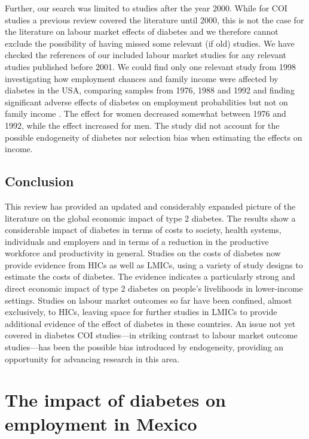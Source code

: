 Further, our search was limited to studies after the year 2000. While for \ac{COI} studies a previous review covered the literature until 2000, this is not the case for the literature on labour market effects of diabetes and we therefore cannot exclude the possibility of having missed some relevant (if old) studies. We have checked the references of our included labour market
studies for any relevant studies published before 2001. We could find only one relevant study from 1998 investigating how employment
chances and family income were affected by diabetes in the USA, comparing samples from 1976, 1988 and 1992 and finding significant
adverse effects of diabetes on employment probabilities but not on family income \parencite{Kahn1998b}. The effect for women decreased somewhat between 1976 and 1992, while the effect increased for men. The study did not account for the possible endogeneity of diabetes nor selection bias when estimating the effects on income.

\section{Conclusion}

This review has provided an updated and considerably expanded picture of the literature on the global economic impact of type 2 diabetes. The results show a considerable impact of diabetes in terms of costs to society, health systems, individuals and employers and in terms of a reduction in the productive workforce and productivity in general. Studies on the costs of diabetes now provide evidence from \acp{HIC} as well as \acp{LMIC}, using a variety of study designs to estimate the costs of diabetes. The evidence indicates a particularly strong and direct economic impact of type 2 diabetes on people's livelihoods in lower-income settings. Studies on labour market outcomes so far have been confined, almost exclusively, to \acp{HIC}, leaving space for further studies in \acp{LMIC} to provide additional evidence of the effect of diabetes in these countries. An issue not yet covered in diabetes \ac{COI} studies---in striking contrast to labour market outcome studies---has been the possible bias introduced by endogeneity, providing an opportunity for advancing research in this area. 
\clearpage

 \newpage 
\acresetall  %
\chapter{\label{cha:Mex1}The impact of diabetes on employment in Mexico}
